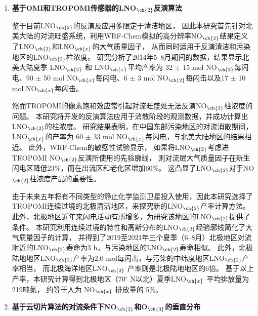 \begin{enumerate}[label=（\arabic*）, labelindent=\parindent, nosep, leftmargin=0pt, widest=0, itemindent=*, topsep=0pt, partopsep=0pt, parsep=0pt]

\item \textbf{基于OMI和TROPOMI传感器的LNO$_{\ch{2}}$反演算法}

\hspace{4ex} 鉴于目前LNO$_{\ch{2}}$的反演及应用多限定于清洁地区，
因此本研究首先针对北美大陆的对流旺盛系统，利用WRF-Chem模拟的高分辨率NO$_{\ch{2}}$结果定义了LNO$_{\ch{2}}$和LNO$_{\ch{x}}$的大气质量因子，
从而同时适用于反演清洁和污染地区的LNO$_{\ch{2}}$柱浓度。
研究分析了2014年5--8月期间的数据，结果显示北美大陆夏季 LNO$_{\ch{2}}$ 和 LNO$_{\ch{x}}$平均产率为
32 $\pm$ 15 mol NO$_{\ch{2}}$每闪电、90 $\pm$ 50 mol NO$_{\ch{x}}$每闪电、6 $\pm$ 3 mol NO$_{\ch{2}}$每闪击以及17 $\pm$ 10 mol NO$_{\ch{x}}$每闪击。

\hspace{4ex} 然而TROPOMI的像素饱和效应常引起对流旺盛处无法反演NO$_{\ch{2}}$柱浓度的问题。
本研究将开发的反演算法应用于消散阶段的观测数据，并成功计算出LNO$_{\ch{2}}$的柱浓度。
研究结果表明，在中国东部污染地区的对流消散期间，LNO$_{\ch{x}}$的产率为 60 $\pm$ 33 mol NO$_{\ch{x}}$每闪电，与北美大陆地区的结果相近。
此外，WRF-Chem的敏感性试验显示，
如果将LNO$_{\ch{2}}$考虑进TROPOMI NO$_{\ch{2}}$反演所使用的先验廓线，
则对流层大气质量因子在新生闪电区降低23\%，而在出流区和老化区增加60\%。
这凸显了LNO$_{\ch{2}}$对于NO$_{\ch{2}}$柱浓度产品的重要性。

\hspace{4ex} 由于未来五年将有不同类型的静止化学监测卫星投入使用，因此本研究选择了TROPOMI连续过境的北极清洁地区，来探究新的LNO$_{\ch{2}}$产率计算方法。
此外，北极地区近年来闪电活动有所增多，为研究该地区的LNO$_{\ch{2}}$提供了条件。
本研究利用连续过境的特性和高斯分布的LNO$_{\ch{2}}$经验廓线简化了大气质量因子的计算，%
并得到了2019至2021年三个夏季（6--8月）北极地区对流附近的LNO$_{\ch{2}}$寿命为3 h，与污染地区的LNO$_{\ch{2}}$寿命相似。
此外，北极陆地地区LNO$_{\ch{2}}$产率为2.0 mol每闪击，与污染的中纬度地区LNO$_{\ch{2}}$产率相当，
而北极海洋地区LNO$_{\ch{2}}$ 产率则是北极陆地地区的6倍。
基于以上产率，本研究计算得到北极地区（70$^{\circ}$ N以北）夏季LNO$_{\ch{x}}$ 平均排放量为219吨氮，
约等于人为 NO$_{\ch{x}}$ 排放量的 5\%。

\item \textbf{基于云切片算法的对流条件下NO$_{\ch{2}}$和O$_{\ch{3}}$的垂直分布}


\end{enumerate}
